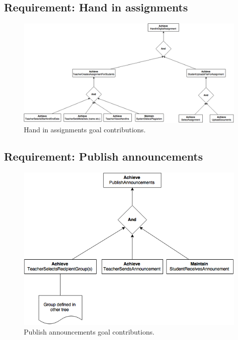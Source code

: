 \clearpage
\subsection{Requirement: Hand in assignments}
\begin{figure}[h!]
	\centering
	\includegraphics[width=1\linewidth]{images/HandInAssignment.png}
	\caption{Hand in assignments goal contributions.}
	\label{fig:goal_hand_in_assignments}
\end{figure}

\clearpage
\subsection{Requirement: Publish announcements}
\begin{figure}[h!]
	\centering
	\includegraphics[width=1\linewidth]{images/PublishAnnouncements.png}
	\caption{Publish announcements goal contributions.}
	\label{fig:goal_publish_announcements}
\end{figure}


